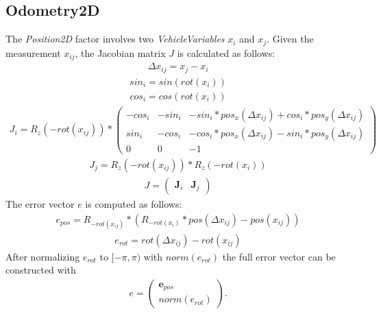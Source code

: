 \subsection{Odometry2D}
The \textit{Position2D} factor involves two \textit{VehicleVariables} $x_i$ and $x_j$. Given the measurement $x_{ij}$, the Jacobian matrix $J$ is calculated as follows:
\begin{align}
	\Delta x_{ij} = x_j - x_i
\end{align}
\begin{align}
	sin_i = sin(rot(x_i))
\end{align}
\begin{align}
	cos_i = cos(rot(x_i))
\end{align}
\begin{align}
	J_i = R_z(-rot(x_{ij})) *
	\begin{pmatrix}
		-cos_i & -sin_i & -sin_i*pos_x(\Delta x_{ij}) + cos_i*pos_y(\Delta x_{ij})\\
		 sin_i & -cos_i & -cos_i*pos_x(\Delta x_{ij}) - sin_i*pos_y(\Delta x_{ij})\\
		     0 &      0 &                                   -1
	\end{pmatrix}
\end{align}
\begin{align}
	J_j = R_z(-rot(x_{ij})) * R_z(-rot(x_i))
\end{align}
\begin{align}
	J =
	\begin{pmatrix}
		\boldsymbol{J}_i & \boldsymbol{J}_j
	\end{pmatrix}
\end{align}
The error vector $e$ is computed as follows:
\begin{align}
	e_{pos} = R_{-rot(x_{ij})} * (R_{-rot(x_i)} * pos(\Delta x_{ij}) - pos(x_{ij}))
\end{align}
\begin{align}
	e_{rot} = rot(\Delta x_{ij}) - rot(x_{ij})
\end{align}
After normalizing $e_{rot}$ to $[-\pi, \pi)$ with $norm(e_{rot})$ the full error vector can be constructed with
\begin{align}
	e =
	\begin{pmatrix}
		\boldsymbol{e}_{pos}\\
		norm(e_{rot})
	\end{pmatrix}
	.
\end{align}



